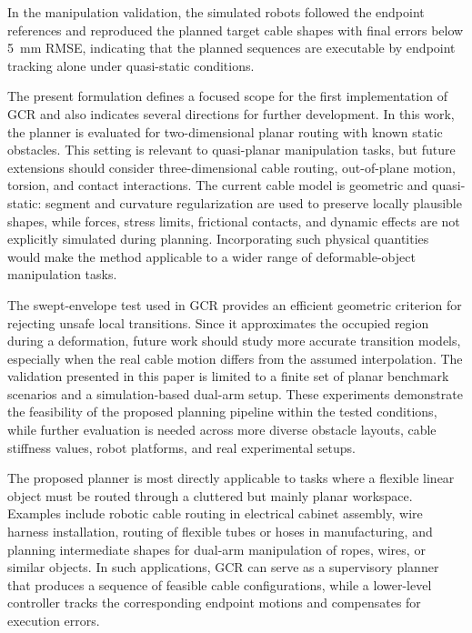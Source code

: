 \documentclass{pas}
\begin{document}
In the manipulation validation, the simulated robots followed the endpoint references and reproduced the planned target cable shapes with final errors below 5~mm RMSE, indicating that the planned sequences are executable by endpoint tracking alone under quasi-static conditions.

The present formulation defines a focused scope for the first implementation of
GCR and also indicates several directions for further development. In this work,
the planner is evaluated for two-dimensional planar routing with known static
obstacles. This setting is relevant to quasi-planar manipulation tasks, but
future extensions should consider three-dimensional cable routing, out-of-plane
motion, torsion, and contact interactions. The current cable model is
geometric and quasi-static: segment and curvature regularization are used to
preserve locally plausible shapes, while forces, stress limits, frictional
contacts, and dynamic effects are not explicitly simulated during planning.
Incorporating such physical quantities would make the method applicable to a
wider range of deformable-object manipulation tasks.

The swept-envelope test used in GCR provides an efficient geometric criterion
for rejecting unsafe local transitions. Since it approximates the occupied
region during a deformation, future work should study more accurate transition
models, especially when the real cable motion differs from the assumed
interpolation. The validation presented in this paper is limited to a finite set
of planar benchmark scenarios and a simulation-based dual-arm setup. These
experiments demonstrate the feasibility of the proposed planning pipeline within
the tested conditions, while further evaluation is needed across more diverse
obstacle layouts, cable stiffness values, robot platforms, and real experimental
setups.

The proposed planner is most directly applicable to tasks where a flexible
linear object must be routed through a cluttered but mainly planar workspace.
Examples include robotic cable routing in electrical cabinet assembly, wire
harness installation, routing of flexible tubes or hoses in manufacturing, and
planning intermediate shapes for dual-arm manipulation of ropes, wires, or
similar objects. In such applications, GCR can serve as a supervisory planner
that produces a sequence of feasible cable configurations, while a lower-level
controller tracks the corresponding endpoint motions and compensates for
execution errors.
\end{document}
